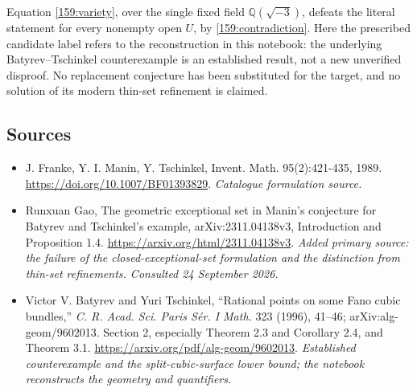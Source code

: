 \documentclass[11pt,a4paper]{article}
\newcommand{\Q}{\mathbb{Q}}
\numberwithin{equation}{section}
\begin{document}
Equation \eqref{159:variety}, over the single fixed field
$\Q(\sqrt{-3})$, defeats the literal statement for every nonempty open
$U$, by \eqref{159:contradiction}. Here the prescribed candidate label
refers to the reconstruction in this notebook: the underlying
Batyrev--Tschinkel counterexample is an established result, not a new
unverified disproof. No replacement conjecture has been substituted for
the target, and no solution of its modern thin-set refinement is claimed.

\subsection{Sources}
\begin{itemize}\raggedright
\item[\textnormal{[S1]}]\hypertarget{source:159:1}{} J. Franke, Y. I. Manin, Y. Tschinkel, Invent. Math. 95(2):421-435, 1989.
\url{https://doi.org/10.1007/BF01393829}.
{\small\textit{Catalogue formulation source.}}
\item[\textnormal{[E1]}]\hypertarget{extra:159:1}{} Runxuan Gao, The geometric exceptional set in Manin's conjecture for Batyrev and Tschinkel's example, arXiv:2311.04138v3, Introduction and Proposition 1.4.
\url{https://arxiv.org/html/2311.04138v3}.
{\small\textit{Added primary source: the failure of the closed-exceptional-set formulation and the distinction from thin-set refinements. Consulted 24 September 2026.}}
\item[\textnormal{[E2]}]\hypertarget{extra:159:2}{} Victor V. Batyrev and Yuri Tschinkel, ``Rational points on some Fano cubic bundles,'' \emph{C. R. Acad. Sci. Paris S\'er. I Math.} 323 (1996), 41--46; arXiv:alg-geom/9602013. Section 2, especially Theorem 2.3 and Corollary 2.4, and Theorem 3.1.
\url{https://arxiv.org/pdf/alg-geom/9602013}.
{\small\textit{Established counterexample and the split-cubic-surface lower bound; the notebook reconstructs the geometry and quantifiers.}}
\end{itemize}
\end{document}
